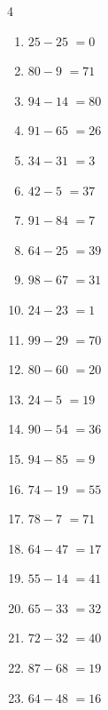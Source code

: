 \begin{multicols}{4}
\begin{enumerate}
  \item $25-25$
        $=0$

  \item $80-9$
        $=71$

  \item $94-14$
        $=80$

  \item $91-65$
        $=26$

  \item $34-31$
        $=3$

  \item $42-5$
        $=37$

  \item $91-84$
        $=7$

  \item $64-25$
        $=39$

  \item $98-67$
        $=31$

  \item $24-23$
        $=1$

  \item $99-29$
        $=70$

  \item $80-60$
        $=20$

  \item $24-5$
        $=19$

  \item $90-54$
        $=36$

  \item $94-85$
        $=9$

  \item $74-19$
        $=55$

  \item $78-7$
        $=71$

  \item $64-47$
        $=17$

  \item $55-14$
        $=41$

\columnbreak %

\resetques

  \item $65-33$
        $=32$

  \item $72-32$
        $=40$

  \item $87-68$
        $=19$

  \item $64-48$
        $=16$


\end{enumerate}
\end{multicols}
